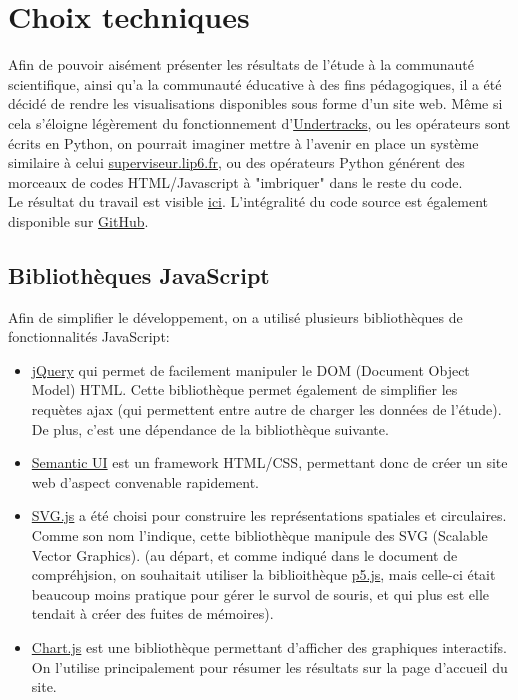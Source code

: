 \documentclass{article}
\begin{document}
\section{Choix techniques}
Afin de pouvoir aisément présenter les résultats de l'étude à la communauté scientifique, ainsi qu'a la communauté éducative à des fins pédagogiques, il a été décidé de rendre les visualisations disponibles sous forme d'un site web. Même si cela s'éloigne légèrement du fonctionnement d'\href{https://undertracks.imag.fr}{Undertracks}, ou les opérateurs sont écrits en Python, on pourrait imaginer mettre à l'avenir en place un système similaire à celui \href{http://superviseur.lip6.fr}{superviseur.lip6.fr}, ou des opérateurs Python générent des morceaux de codes HTML/Javascript à "imbriquer" dans le reste du code.\\
Le résultat du travail est visible \href{https://vertmo.github.io/SuperViseur/}{ici}. L'intégralité du code source est également disponible sur \href{https://github.com/Vertmo/SuperViseur}{GitHub}.

\subsection{Bibliothèques JavaScript}
Afin de simplifier le développement, on a utilisé plusieurs bibliothèques de fonctionnalités JavaScript:
\begin{itemize}
    \item \href{https://jquery.com/}{jQuery} qui permet de facilement manipuler le DOM (Document Object Model) HTML. Cette bibliothèque permet également de simplifier les requètes ajax (qui permettent entre autre de charger les données de l'étude). De plus, c'est une dépendance de la bibliothèque suivante.
    \item \href{https://semantic-ui.com/}{Semantic UI} est un framework HTML/CSS, permettant donc de créer un site web d'aspect convenable rapidement.
    \item \href{http://svgjs.com/}{SVG.js} a été choisi pour construire les représentations spatiales et circulaires. Comme son nom l'indique, cette bibliothèque manipule des SVG (Scalable Vector Graphics). (au départ, et comme indiqué dans le document de compréhjsion, on souhaitait utiliser la biblioithèque \href{https://p5js.org/}{p5.js}, mais celle-ci était beaucoup moins pratique pour gérer le survol de souris, et qui plus est elle tendait à créer des fuites de mémoires).
    \item \href{http://www.chartjs.org/}{Chart.js} est une bibliothèque permettant d'afficher des graphiques interactifs. On l'utilise principalement pour résumer les résultats sur la page d'accueil du site.
\end{itemize}
\end{document}
